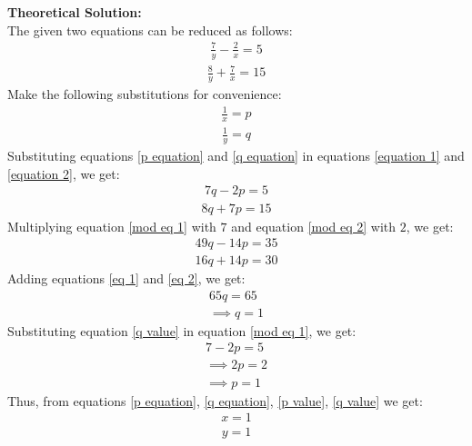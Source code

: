 \documentclass[journal]{IEEEtran}
\begin{document}
\textbf{Theoretical Solution:}\\
The given two equations can be reduced as follows:
\begin{align}
    \frac{7}{y} - \frac{2}{x} = 5 \label{equation 1}
\end{align}
\begin{align}
    \frac{8}{y} + \frac{7}{x} = 15 \label{equation 2}
\end{align}
Make the following substitutions for convenience:
\begin{align}
    \frac{1}{x} = p \label{p equation}
\end{align}
\begin{align}
    \frac{1}{y} = q \label{q equation}
\end{align}
Substituting equations \eqref{p equation} and \eqref{q equation} in equations \eqref{equation 1} and \eqref{equation 2}, we get:
\begin{align}
    7q - 2p = 5 \label{mod eq 1}
\end{align}
\begin{align}
    8q + 7p = 15 \label{mod eq 2}
\end{align}
Multiplying equation \eqref{mod eq 1} with $7$ and equation \eqref{mod eq 2} with $2$, we get:
\begin{align}
    49q - 14p = 35 \label{eq 1}
\end{align}
\begin{align}
    16q + 14p = 30 \label{eq 2}
\end{align}
Adding equations \eqref{eq 1} and \eqref{eq 2}, we get:
\begin{align}
    65q = 65 \\
    \implies q = 1 \label{q value}
\end{align}
Substituting equation \eqref{q value} in equation \eqref{mod eq 1}, we get:
\begin{align}
    7 - 2p = 5 \\
    \implies 2p = 2 \\
    \implies p = 1 \label{p value}
\end{align}
Thus, from equations \eqref{p equation}, \eqref{q equation}, \eqref{p value}, \eqref{q value} we get:
\begin{align}
    x = 1
\end{align}
\begin{align}
    y = 1
\end{align}
\end{document}
